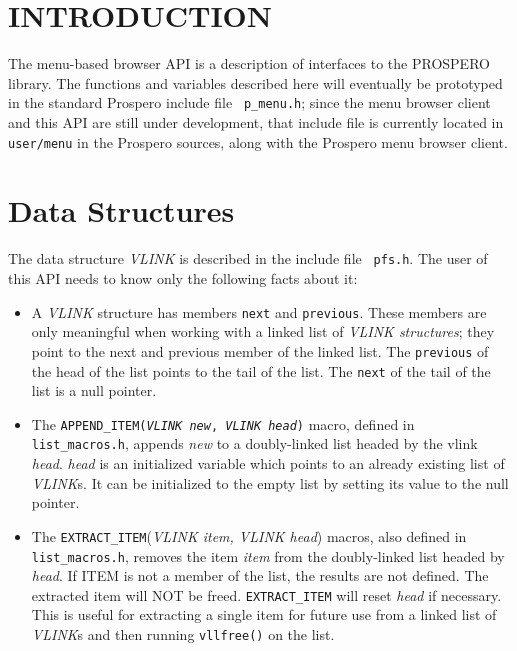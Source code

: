 \tableofcontents

\section{INTRODUCTION}

The menu-based browser API is a description of interfaces to the
PROSPERO library.  The functions and variables described here will
eventually be prototyped in the standard Prospero include file {\tt
p\_menu.h}; since the menu browser client and this API are still under
development, that include file is currently located in {\tt user/menu}
in the Prospero sources, along with the Prospero menu browser client.

\section{Data Structures}

The data structure {\it VLINK} is described in the include file {\tt
pfs.h}.  The user of this API needs to know only the following facts
about it:

\begin{itemize}

\item A {\it VLINK} structure has members {\tt next}
and {\tt previous}.  These members are only meaningful when working with a
linked list of {\it VLINK structures}; they point to the next and
previous member of the linked list.  The {\tt previous} of the head of the
list points to the tail of the list.  The {\tt next} of the tail of
the list is a null pointer. 

\item The {\tt APPEND\_ITEM({\it VLINK new}, {\it VLINK head})} macro,
defined in {\tt list\_macros.h},  appends {\it new} to a doubly-linked
list headed by the vlink {\it head}.  {\it head} is an initialized
variable which points to an already existing list of {\it VLINK}s.  It
can be initialized to the empty list by setting its value to the null pointer.

\item The {\tt EXTRACT\_ITEM}({\it VLINK item, VLINK head}) macros,
also defined in {\tt list\_macros.h}, removes the item {\it item} from
the doubly-linked list headed by {\it head}.  If ITEM is not a member
of the list, the results are not defined.  The extracted item will NOT
be freed.  {\tt EXTRACT\_ITEM} will reset {\it head} if necessary.
This is useful for extracting a single item for future use from a
linked list of {\it VLINK}s and then running {\tt vllfree()} on the
list.

\end{itemize}

